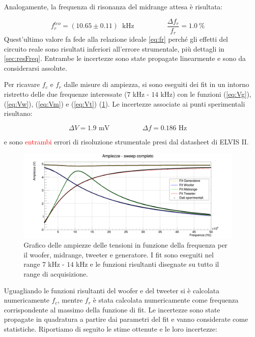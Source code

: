 \documentclass[12pt,italian]{article}
\newcommand{\err}[1]{\textcolor{red}{#1}}
\begin{document}
\noindent
Analogamente, la frequenza di risonanza del midrange attesa è risultata:

\begin{equation*}
	f_{r}^{teo} = (10.65 \pm 0.11)\  \text{ kHz} \hspace{2cm} \frac{\Delta f_{r}}{f_{r}} = 1.0 \ \%
\end{equation*}
Quest'ultimo valore fa fede alla relazione ideale \eqref{eq:fr} perché gli effetti del circuito reale sono risultati inferiori
all'errore strumentale, più dettagli in \cref{sec:resFreq}. Entrambe le incertezze sono state propagate linearmente e sono da considerarsi assolute.

Per ricavare $f_{c}$ e $f_{r}$ dalle misure di ampiezza, si sono eseguiti dei
fit in un intorno ristretto delle due frequenze interessate ($ 7 $ kHz - $ 14 $
kHz) con le funzioni (\ref{eq:Vg}), (\ref{eq:Vw}), (\ref{eq:Vm}) e
(\ref{eq:Vt}) (\cref{fig:amp_sweep}). Le incertezze associate ai punti
sperimentali risultano:

\begin{equation*}
	\Delta V = 1.9 \text{ mV} \hspace{2cm} \Delta f = 0.186 \text{ Hz}
\end{equation*}

\noindent
e sono \err{entrambi} errori di risoluzione strumentale presi dal datasheet di ELVIS
II.

\begin{figure}[h]
	\centering
	\includegraphics[width=\textwidth]{fig_amp.png}
	\caption{Grafico delle ampiezze delle tensioni in funzione della frequenza per il woofer, midrange, tweeter e generatore. I fit sono eseguiti nel range $7$ kHz - $14$ kHz e le funzioni risultanti disegnate su tutto il range di acquisizione.}\label{fig:fc_fr}
	\label{fig:amp_sweep}
\end{figure}

Uguagliando le funzioni risultanti del woofer e del tweeter si è calcolata
numericamente $f_{c}$, mentre $f_{r}$ è stata calcolata numericamente come
frequenza corrispondente al massimo della funzione di fit. Le incertezze sono
state propagate in quadratura a partire dai parametri del fit e vanno
considerate come statistiche. Riportiamo di seguito le stime ottenute e le loro
incertezze:
\end{document}

